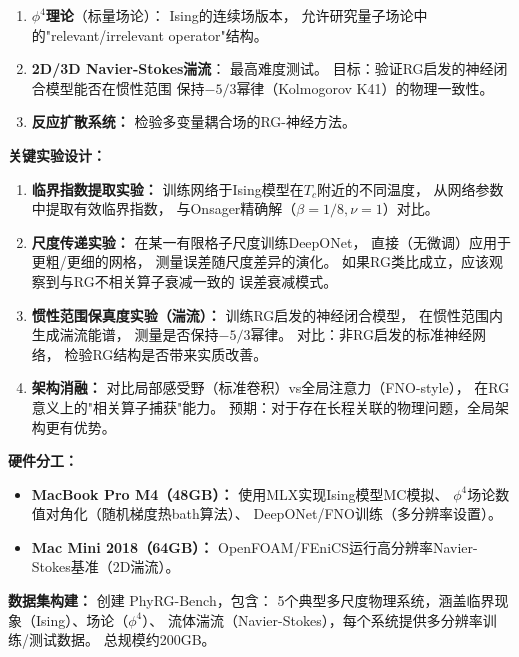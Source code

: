 \documentclass[12pt,a4paper,twoside]{article}
\begin{document}
\begin{inversation}
\begin{enumerate}
    \item \textbf{$\phi^4$理论}（标量场论）：
        Ising的连续场版本，
        允许研究量子场论中的"relevant/irrelevant operator"结构。

    \item \textbf{2D/3D Navier-Stokes湍流}：
        最高难度测试。
        目标：验证RG启发的神经闭合模型能否在惯性范围
        保持$-5/3$幂律（Kolmogorov K41）的物理一致性。

    \item \textbf{反应扩散系统：} 检验多变量耦合场的RG-神经方法。
\end{enumerate}

\textbf{关键实验设计：}

\begin{enumerate}
    \item \textbf{临界指数提取实验：}
        训练网络于Ising模型在$T_c$附近的不同温度，
        从网络参数中提取有效临界指数，
        与Onsager精确解（$\beta=1/8, \nu=1$）对比。

    \item \textbf{尺度传递实验：}
        在某一有限格子尺度训练DeepONet，
        直接（无微调）应用于更粗/更细的网格，
        测量误差随尺度差异的演化。
        如果RG类比成立，应该观察到与RG不相关算子衰减一致的
        误差衰减模式。

    \item \textbf{惯性范围保真度实验（湍流）：}
        训练RG启发的神经闭合模型，
        在惯性范围内生成湍流能谱，
        测量是否保持$-5/3$幂律。
        对比：非RG启发的标准神经网络，
        检验RG结构是否带来实质改善。

    \item \textbf{架构消融：}
        对比局部感受野（标准卷积）vs全局注意力（FNO-style），
        在RG意义上的"相关算子捕获"能力。
        预期：对于存在长程关联的物理问题，全局架构更有优势。
\end{enumerate}

\textbf{硬件分工：}

\begin{itemize}
    \item \textbf{MacBook Pro M4（48GB）：} 使用MLX实现Ising模型MC模拟、
        $\phi^4$场论数值对角化（随机梯度热bath算法）、
        DeepONet/FNO训练（多分辨率设置）。
    \item \textbf{Mac Mini 2018（64GB）：} 
        OpenFOAM/FEniCS运行高分辨率Navier-Stokes基准（2D湍流）。
\end{itemize}

\textbf{数据集构建：}
创建 PhyRG-Bench，包含：
5个典型多尺度物理系统，涵盖临界现象（Ising）、场论（$\phi^4$）、
流体湍流（Navier-Stokes），每个系统提供多分辨率训练/测试数据。
总规模约200GB。


\end{inversation}
\end{document}

